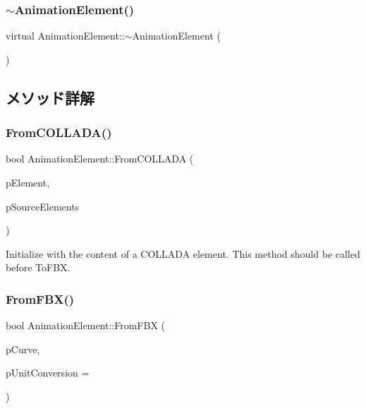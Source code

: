 \subsubsection{\texorpdfstring{$\sim$\+Animation\+Element()}{~AnimationElement()}}
{\footnotesize\ttfamily virtual Animation\+Element\+::$\sim$\+Animation\+Element (\begin{DoxyParamCaption}{ }\end{DoxyParamCaption})\hspace{0.3cm}{\ttfamily [virtual]}}



\subsection{メソッド詳解}
\mbox{\label{class_animation_element_ad0a36ae16945ef4a3027bb8f57452c45}} 
\subsubsection{\texorpdfstring{From\+C\+O\+L\+L\+A\+D\+A()}{FromCOLLADA()}}
{\footnotesize\ttfamily bool Animation\+Element\+::\+From\+C\+O\+L\+L\+A\+DA (\begin{DoxyParamCaption}\item[{xml\+Node $\ast$}]{p\+Element,  }\item[{const \hyperlink{fbxcolladautils_8h_a43e0f8079e4c5df7b8b0496de1f120c3}{Source\+Element\+Map\+Type} \&}]{p\+Source\+Elements }\end{DoxyParamCaption})}

Initialize with the content of a C\+O\+L\+L\+A\+DA element. This method should be called before To\+F\+BX. \mbox{\label{class_animation_element_a44a774ba612fb2707dee931048231686}} 
\subsubsection{\texorpdfstring{From\+F\+B\+X()}{FromFBX()}}
{\footnotesize\ttfamily bool Animation\+Element\+::\+From\+F\+BX (\begin{DoxyParamCaption}\item[{const \hyperlink{class_fbx_anim_curve}{Fbx\+Anim\+Curve} $\ast$}]{p\+Curve,  }\item[{double}]{p\+Unit\+Conversion = {} }\end{DoxyParamCaption})}

